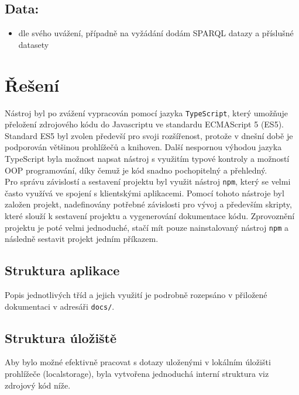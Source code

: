 \documentclass[
12pt,
a4paper,
pdftex,
czech,
titlepage
]{article}
\begin{document}
\hypertarget{data}{%
\subsection{Data:}\label{data}}

\begin{itemize}
\item
  dle svého uvážení, případně na vyžádání dodám SPARQL datazy a
  příslušné datasety
\end{itemize}

\section{Řešení}

Nástroj byl po zvážení vypracován pomocí jazyka \texttt{TypeScript}, který umožňuje přeložení zdrojového kódu do Javascriptu ve standardu ECMAScript 5 (ES5). Standard ES5 byl zvolen předevší pro svoji rozšířenost, protože v dnešní době je podporován většinou prohlížečů a knihoven. Další nespornou výhodou jazyka TypeScript byla možnost napsat nástroj s využitím typové kontroly a možností OOP programování, díky čemuž je kód snadno pochopitelný a přehledný. \\

Pro správu závislostí a sestavení projektu byl využit nástroj \texttt{npm}, který se velmi často využívá ve spojení s klientskými aplikacemi. Pomocí tohoto nástroje byl založen projekt, nadefinovány potřebné závislosti pro vývoj a především skripty, které slouží k sestavení projektu a vygenerování dokumentace kódu. Zprovoznění projektu je poté velmi jednoduché, stačí mít pouze nainstalovaný nástroj \texttt{npm} a následně sestavit projekt jedním příkazem.

\subsection{Struktura aplikace}
\label{sec:structure}

Popis jednotlivých tříd a jejich využití je podrobně rozepsáno v přiložené dokumentaci v adresáři \texttt{docs/}.

\subsection{Struktura úložiště}

Aby bylo možné efektivně pracovat s dotazy uloženými v lokálním úložišti prohlížeče (localstorage), byla vytvořena jednoduchá interní struktura viz zdrojový kód níže. 
\end{document}
